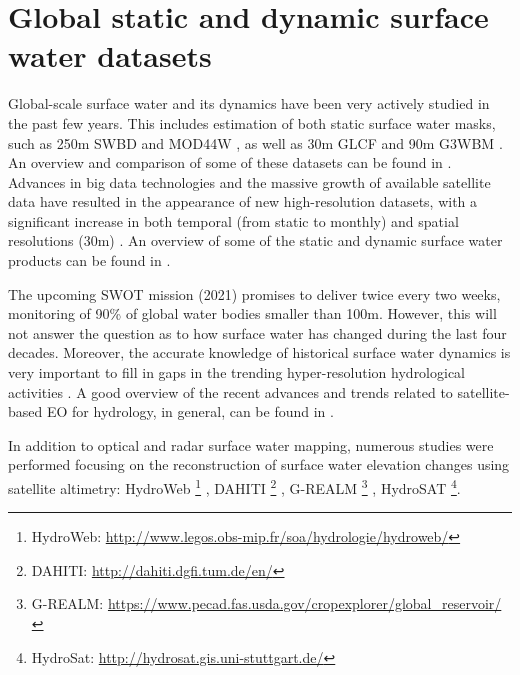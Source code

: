
\section{Global static and dynamic surface water datasets}

Global-scale surface water and its dynamics have been very actively studied in the past few years. This includes estimation of both static surface water masks, such as 250m SWBD \citet{farr2007shuttle} and MOD44W \citet{carroll2009new}, as well as 30m GLCF \citet{feng2016global} and 90m G3WBM \citet{yamazaki2015development}.
An overview and comparison of some of these datasets can be found in \citet{lamarche2017compilation}. Advances in big data technologies and the massive growth of available satellite data have resulted in the appearance of new high-resolution datasets, with a significant increase in both temporal (from static to monthly) and spatial resolutions (30m) \citet{pekel2016high}. An overview of some of the static and dynamic surface water products can be found in \citet{yamazaki2016hydrology}.

The upcoming SWOT mission (2021) promises to deliver twice every two weeks, monitoring of 90\% of global water bodies smaller than 100m. However, this will not answer the question as to how surface water has changed during the last four decades. Moreover, the accurate knowledge of historical surface water dynamics is very important to fill in gaps in the trending hyper-resolution hydrological activities \citet{bierkens2015hyper}. A good overview of the recent advances and trends related to satellite-based EO for hydrology, in general, can be found in \citet{mccabe2017future}.

In addition to optical and radar surface water mapping, numerous studies were performed focusing on the reconstruction of surface water elevation changes using satellite altimetry: HydroWeb \footnote{HydroWeb: \url{http://www.legos.obs-mip.fr/soa/hydrologie/hydroweb/}} \citet{cretaux2005satellite}, DAHITI \footnote{DAHITI: \url{http://dahiti.dgfi.tum.de/en/}} \citet{schwatke2015dahiti}, G-REALM \footnote{G-REALM: \url{https://www.pecad.fas.usda.gov/cropexplorer/global_reservoir/}} \citet{birkett2011research}, HydroSAT \footnote{HydroSat: \url{http://hydrosat.gis.uni-stuttgart.de/}}. 

